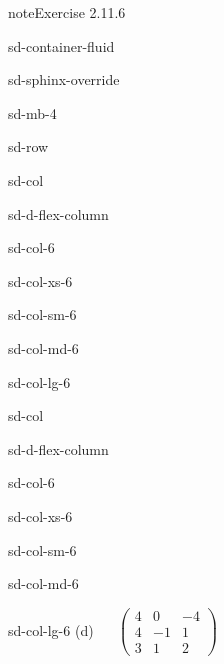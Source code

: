 \documentclass[letterpaper,10pt,english]{jupyterBook}
\begin{document}
\begin{sphinxadmonition}{note}{Exercise 2.11.6}
\begin{sphinxuseclass}{sd-container-fluid}
\begin{sphinxuseclass}{sd-sphinx-override}
\begin{sphinxuseclass}{sd-mb-4}
\begin{sphinxuseclass}{sd-row}
\begin{sphinxuseclass}{sd-col}
\begin{sphinxuseclass}{sd-d-flex-column}
\begin{sphinxuseclass}{sd-col-6}
\begin{sphinxuseclass}{sd-col-xs-6}
\begin{sphinxuseclass}{sd-col-sm-6}
\begin{sphinxuseclass}{sd-col-md-6}
\begin{sphinxuseclass}{sd-col-lg-6}
\end{sphinxuseclass}
\end{sphinxuseclass}
\end{sphinxuseclass}
\end{sphinxuseclass}
\end{sphinxuseclass}
\end{sphinxuseclass}
\end{sphinxuseclass}
\begin{sphinxuseclass}{sd-col}
\begin{sphinxuseclass}{sd-d-flex-column}
\begin{sphinxuseclass}{sd-col-6}
\begin{sphinxuseclass}{sd-col-xs-6}
\begin{sphinxuseclass}{sd-col-sm-6}
\begin{sphinxuseclass}{sd-col-md-6}
\begin{sphinxuseclass}{sd-col-lg-6}
\sphinxAtStartPar
(d)  
\( \begin{pmatrix} 4 & 0 & -4 \\ 4 & -1 & 1 \\ 3 & 1 & 2 \end{pmatrix} \)

\end{sphinxuseclass}
\end{sphinxuseclass}
\end{sphinxuseclass}
\end{sphinxuseclass}
\end{sphinxuseclass}
\end{sphinxuseclass}
\end{sphinxuseclass}
\end{sphinxuseclass}
\end{sphinxuseclass}
\end{sphinxuseclass}
\end{sphinxuseclass}\end{sphinxadmonition}
 \label{exercise:systems-ex-consistency}
\end{document}
